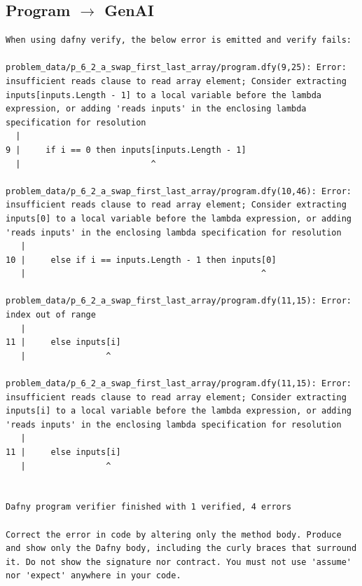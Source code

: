\documentclass{article}
\begin{document}
\subsection*{Program $\rightarrow$ GenAI}
\begin{lstlisting}
When using dafny verify, the below error is emitted and verify fails:

problem_data/p_6_2_a_swap_first_last_array/program.dfy(9,25): Error: insufficient reads clause to read array element; Consider extracting inputs[inputs.Length - 1] to a local variable before the lambda expression, or adding 'reads inputs' in the enclosing lambda specification for resolution
  |
9 |     if i == 0 then inputs[inputs.Length - 1]
  |                          ^

problem_data/p_6_2_a_swap_first_last_array/program.dfy(10,46): Error: insufficient reads clause to read array element; Consider extracting inputs[0] to a local variable before the lambda expression, or adding 'reads inputs' in the enclosing lambda specification for resolution
   |
10 |     else if i == inputs.Length - 1 then inputs[0]
   |                                               ^

problem_data/p_6_2_a_swap_first_last_array/program.dfy(11,15): Error: index out of range
   |
11 |     else inputs[i]
   |                ^

problem_data/p_6_2_a_swap_first_last_array/program.dfy(11,15): Error: insufficient reads clause to read array element; Consider extracting inputs[i] to a local variable before the lambda expression, or adding 'reads inputs' in the enclosing lambda specification for resolution
   |
11 |     else inputs[i]
   |                ^


Dafny program verifier finished with 1 verified, 4 errors

Correct the error in code by altering only the method body. Produce and show only the Dafny body, including the curly braces that surround it. Do not show the signature nor contract. You must not use 'assume' nor 'expect' anywhere in your code.
\end{lstlisting}
\end{document}
